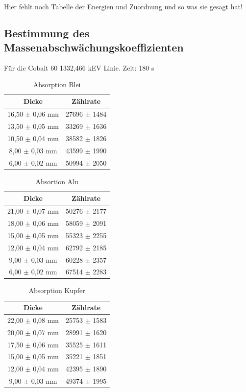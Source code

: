 \documentclass[
	parskip=half,10pt,
	numbers= noenddot, %
	toc=flat, %
	oneside,
	twocolumn,
	]{scrartcl}
\begin{document}
Hier fehlt noch Tabelle der Energien und Zuordnung und so was sie gesagt hat!

\subsection{Bestimmung des Massenabschwächungskoeffizienten}

Für die Cobalt 60 1332,466 kEV Linie. Zeit: 180 s



\begin{table}[b]
\centering
\begin{tabular}{cc}
 Dicke & Zählrate  \\
 \hline 
 16,50 $\pm$ 0,06 mm & 27696 $\pm$ 1484  \\
 13,50 $\pm$ 0,05 mm & 33269 $\pm$ 1636  \\
 10,50 $\pm$ 0,04 mm & 38582 $\pm$ 1826  \\
  8,00 $\pm$ 0,03 mm & 43599 $\pm$ 1990  \\
  6,00 $\pm$ 0,02 mm & 50994 $\pm$ 2050  \\
\end{tabular}
\caption{Absorption Blei}
\label{tab:abs_blei}
\end{table}

\begin{table}[b]
\centering
\begin{tabular}{cc}
 Dicke & Zählrate \\
 \hline 
 21,00 $\pm$ 0,07 mm & 50276 $\pm$ 2177  \\
 18,00 $\pm$ 0,06 mm & 58059 $\pm$ 2091  \\
 15,00 $\pm$ 0,05 mm & 55323 $\pm$ 2255  \\
 12,00 $\pm$ 0,04 mm & 62792 $\pm$ 2185  \\
  9,00 $\pm$ 0,03 mm & 60228 $\pm$ 2357  \\
  6,00 $\pm$ 0,02 mm & 67514 $\pm$ 2283  \\
\end{tabular}
\caption{Absortion Alu}
\label{tab:abs_alu}
\end{table}

\begin{table}[b]
\centering
\begin{tabular}{cc}
 Dicke & Zählrate \\
 \hline
 22,00 $\pm$ 0,08 mm & 25753 $\pm$ 1583  \\
 20,00 $\pm$ 0,07 mm & 28991 $\pm$ 1620  \\
 17,50 $\pm$ 0,06 mm & 35525 $\pm$ 1611  \\
 15,00 $\pm$ 0,05 mm & 35221 $\pm$ 1851  \\
 12,00 $\pm$ 0,04 mm & 42395 $\pm$ 1890  \\
  9,00 $\pm$ 0,03 mm & 49374 $\pm$ 1995  \\
\end{tabular}
\caption{Absorption Kupfer}
\label{tab:abs_kupfer}
\end{table}
\end{document}
